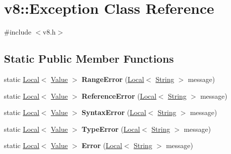 \hypertarget{classv8_1_1Exception}{}\section{v8\+:\+:Exception Class Reference}
\label{classv8_1_1Exception}


{\ttfamily \#include $<$v8.\+h$>$}

\subsection*{Static Public Member Functions}
\begin{DoxyCompactItemize}
\item 
\hypertarget{classv8_1_1Exception_a7fff335c54b4a267b5edab00ca049294}{}static \hyperlink{classv8_1_1Local}{Local}$<$ \hyperlink{classv8_1_1Value}{Value} $>$ {\bfseries Range\+Error} (\hyperlink{classv8_1_1Local}{Local}$<$ \hyperlink{classv8_1_1String}{String} $>$ message)\label{classv8_1_1Exception_a7fff335c54b4a267b5edab00ca049294}

\item 
\hypertarget{classv8_1_1Exception_aa9a1b1806c6ec13e0e8852a05e83f8ef}{}static \hyperlink{classv8_1_1Local}{Local}$<$ \hyperlink{classv8_1_1Value}{Value} $>$ {\bfseries Reference\+Error} (\hyperlink{classv8_1_1Local}{Local}$<$ \hyperlink{classv8_1_1String}{String} $>$ message)\label{classv8_1_1Exception_aa9a1b1806c6ec13e0e8852a05e83f8ef}

\item 
\hypertarget{classv8_1_1Exception_ae9efc01a15b3ea6ed0761ce4b2cfa4ab}{}static \hyperlink{classv8_1_1Local}{Local}$<$ \hyperlink{classv8_1_1Value}{Value} $>$ {\bfseries Syntax\+Error} (\hyperlink{classv8_1_1Local}{Local}$<$ \hyperlink{classv8_1_1String}{String} $>$ message)\label{classv8_1_1Exception_ae9efc01a15b3ea6ed0761ce4b2cfa4ab}

\item 
\hypertarget{classv8_1_1Exception_ad06cda3370edb5b39a5c671bba28754d}{}static \hyperlink{classv8_1_1Local}{Local}$<$ \hyperlink{classv8_1_1Value}{Value} $>$ {\bfseries Type\+Error} (\hyperlink{classv8_1_1Local}{Local}$<$ \hyperlink{classv8_1_1String}{String} $>$ message)\label{classv8_1_1Exception_ad06cda3370edb5b39a5c671bba28754d}

\item 
\hypertarget{classv8_1_1Exception_a77c6ab659f67df0cb0aa0f7c6698f019}{}static \hyperlink{classv8_1_1Local}{Local}$<$ \hyperlink{classv8_1_1Value}{Value} $>$ {\bfseries Error} (\hyperlink{classv8_1_1Local}{Local}$<$ \hyperlink{classv8_1_1String}{String} $>$ message)\label{classv8_1_1Exception_a77c6ab659f67df0cb0aa0f7c6698f019}


\end{DoxyCompactItemize}
